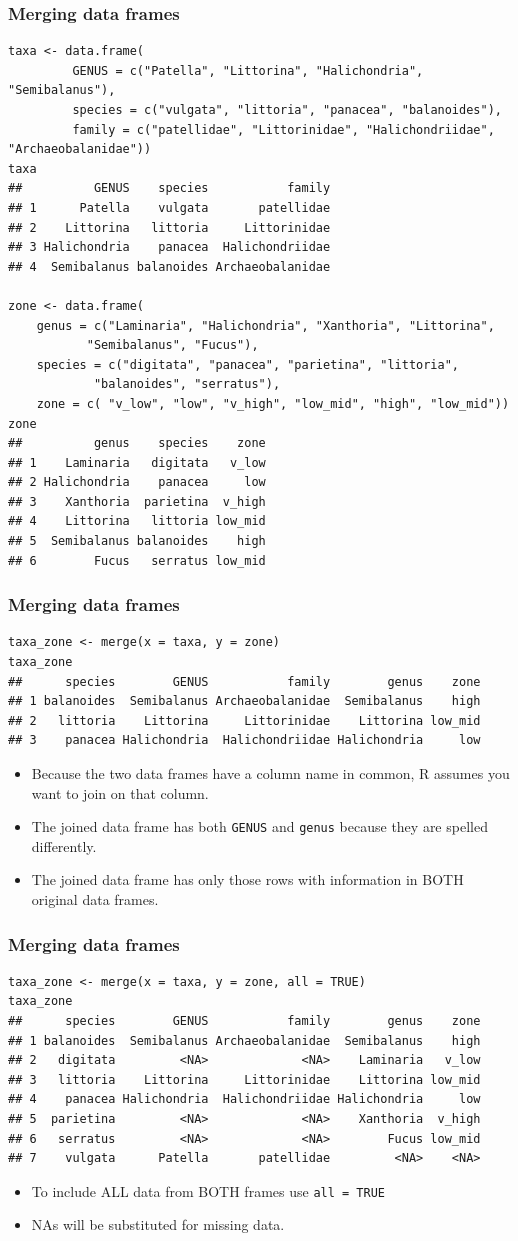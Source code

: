 \documentclass{beamer}
\newcommand{\lsting}[1]{\begin{lstlisting}[basicstyle=#1]}
\newcommand{\bi}{\begin{itemize}}
\newcommand{\li}{\item}
\newcommand{\ei}{\end{itemize}}
\newcommand{\bfr}[1]{\begin{frame}[fragile]\frametitle{{ #1 }}}
\begin{document}
\bfr{Merging data frames}
\lsting{\tiny}
taxa <- data.frame(
         GENUS = c("Patella", "Littorina", "Halichondria", "Semibalanus"),
         species = c("vulgata", "littoria", "panacea", "balanoides"),
         family = c("patellidae", "Littorinidae", "Halichondriidae", "Archaeobalanidae"))
taxa
##          GENUS    species           family
## 1      Patella    vulgata       patellidae
## 2    Littorina   littoria     Littorinidae
## 3 Halichondria    panacea  Halichondriidae
## 4  Semibalanus balanoides Archaeobalanidae

zone <- data.frame(
    genus = c("Laminaria", "Halichondria", "Xanthoria", "Littorina",
           "Semibalanus", "Fucus"),
    species = c("digitata", "panacea", "parietina", "littoria",  
            "balanoides", "serratus"),
    zone = c( "v_low", "low", "v_high", "low_mid", "high", "low_mid"))
zone
##          genus    species    zone
## 1    Laminaria   digitata   v_low
## 2 Halichondria    panacea     low
## 3    Xanthoria  parietina  v_high
## 4    Littorina   littoria low_mid
## 5  Semibalanus balanoides    high
## 6        Fucus   serratus low_mid
\end{lstlisting}
\end{frame}

\bfr{Merging data frames}
\lsting{\tiny}
taxa_zone <- merge(x = taxa, y = zone)
taxa_zone
##      species        GENUS           family        genus    zone
## 1 balanoides  Semibalanus Archaeobalanidae  Semibalanus    high
## 2   littoria    Littorina     Littorinidae    Littorina low_mid
## 3    panacea Halichondria  Halichondriidae Halichondria     low
\end{lstlisting}
\bi
\li Because the two data frames have a column name in common,
R assumes you want to join on that column.
\li The joined data frame has both \verb|GENUS| and \verb|genus| because
they are spelled differently.
\li The joined data frame has only those rows with information in BOTH
original data frames.
\ei
\end{frame}


\bfr{Merging data frames}
\lsting{\tiny}
taxa_zone <- merge(x = taxa, y = zone, all = TRUE)
taxa_zone
##      species        GENUS           family        genus    zone
## 1 balanoides  Semibalanus Archaeobalanidae  Semibalanus    high
## 2   digitata         <NA>             <NA>    Laminaria   v_low
## 3   littoria    Littorina     Littorinidae    Littorina low_mid
## 4    panacea Halichondria  Halichondriidae Halichondria     low
## 5  parietina         <NA>             <NA>    Xanthoria  v_high
## 6   serratus         <NA>             <NA>        Fucus low_mid
## 7    vulgata      Patella       patellidae         <NA>    <NA>
\end{lstlisting}
\bi
\li To include ALL data from BOTH frames use \verb|all = TRUE|
\li NAs will be substituted for missing data.
\ei
\end{frame}
\end{document}

